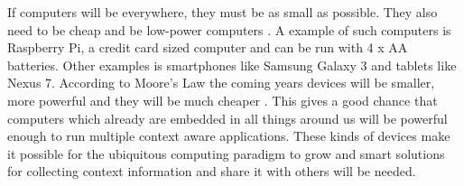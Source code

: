 If computers will be everywhere, they must be as small as possible. They also need to be cheap and be low-power computers \cite{datainspect}. A example of such computers is Raspberry Pi, a credit card sized computer and can be run with 4 x AA batteries. Other examples is smartphones like Samsung Galaxy 3 and tablets like Nexus 7. According to Moore's Law the coming years devices will be smaller, more powerful and they will be much cheaper \cite{591665}. This gives a good chance that computers which already are embedded in all things around us will be powerful enough to run multiple context aware applications. These kinds of devices make it possible for the ubiquitous computing paradigm to grow and smart solutions for collecting context information and share it with others will be needed.